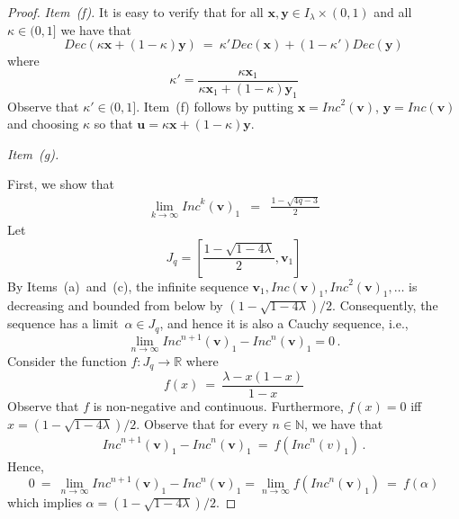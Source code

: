 \documentclass[a4paper,UKenglish,cleveref, autoref, thm-restate]{lipics-v2021}
\newcommand{\N}{\mathbb{N}}
\newcommand{\R}{\mathbb{R}}
\newcommand{\INC}{\mathit{Inc}}
\newcommand{\DEC}{\mathit{Dec}}
\renewcommand{\vec}[1]{\pmb{#1}}
\begin{document}
\begin{proof}
\smallskip
\noindent
\textit{Item~(f).}
It is easy to verify that for all $\vec{x},\vec{y} \in I_\lambda \times (0,1)$ and all $\kappa \in (0,1]$ we have that
\[
    \DEC(\kappa\vec{x} + (1{-}\kappa)\vec{y}) \ = \ 
    \kappa'\DEC(\vec{x}) + (1{-}\kappa') \DEC(\vec{y})
\]
where 
\[
    \kappa' = \frac{\kappa \vec{x}_1}{\kappa\vec{x}_1 + (1{-}\kappa) \vec{y}_1} 
\]
Observe that $\kappa' \in (0,1]$. Item~(f) follows by putting $\vec{x} = \INC^2(\vec{v})$, $\vec{y} = \INC(\vec{v})$ and choosing $\kappa$ so that $\vec{u} = \kappa\vec{x} + (1{-}\kappa)\vec{y}$. 

\smallskip
\noindent
\textit{Item~(g).}

First, we show that 
\begin{eqnarray}
    \lim_{k \to \infty} \INC^k(\vec{v})_1 & = & \frac{1-\sqrt{4q-3}}{2} \label{lim-2}
\end{eqnarray}
Let 
\[
    J_q =    \left[\frac{1-\sqrt{1-4\lambda}}{2},  \vec{v}_1\right] 
\]
By Items~(a)~and~(c), the infinite sequence  $\vec{v}_1, \INC(\vec{v})_1, \INC^2(\vec{v})_1,\ldots$ is decreasing and bounded from below by $(1-\sqrt{1-4\lambda})/2$. Consequently, the sequence has a limit~$\alpha \in J_q$, and hence it is also a Cauchy sequence, i.e.,
\[
    \lim_{n \to \infty} \INC^{n+1}(\vec{v})_1 - \INC^{n}(\vec{v})_1 = 0 \,.
\] 
Consider the function $f : J_q \to \R$ where 
\[
    f(x) \ = \ \frac{\lambda-x(1-x)}{1-x}
\]
Observe that $f$ is non-negative and continuous. Furthermore, $f(x) = 0$ iff $x =  (1 - \sqrt{1-4\lambda})/2$. Observe that for every $n \in \N$, we have that
\begin{eqnarray*}
    \INC^{n+1}(\vec{v})_1 - \INC^{n}(\vec{v})_1 \ = \ 
        f(\INC^{n}(v)_1) \,.
\end{eqnarray*}
Hence, 
\[
    0 \ = \ \lim_{n \to \infty} \INC^{n+1}(\vec{v})_1 - \INC^{n}(\vec{v})_1  =  \lim_{n \to \infty} f(\INC^{n}(\vec{v})_1) \ = \ f(\alpha)
\]
which implies $\alpha = (1 - \sqrt{1-4\lambda})/2$.
\end{proof}
\end{document}
